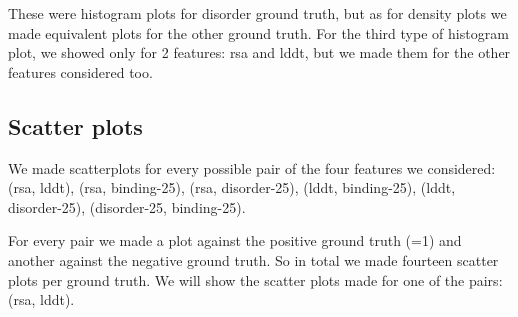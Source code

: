 These were histogram plots for disorder ground truth, but as for density plots we made equivalent plots for the other ground truth. For the third type of histogram plot, we showed only for 2 features: rsa and lddt, but we made them for the other features considered too.

\subsection{Scatter plots}

We made scatterplots for every possible pair of the four features we considered: (rsa, lddt), (rsa, binding-25), (rsa, disorder-25), (lddt, binding-25), (lddt, disorder-25), (disorder-25, binding-25). 

For every pair we made a plot against the positive ground truth (=1) and another against the negative ground truth. So in total we made fourteen scatter plots per ground truth. We will show the scatter plots made for one of the pairs: (rsa, lddt).

